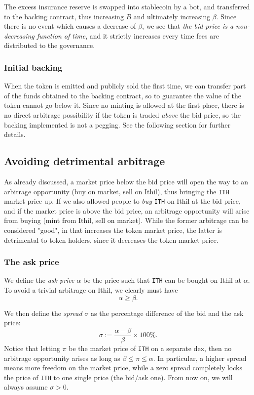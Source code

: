 \documentclass[a4paper,10 pt]{article}
\theoremstyle{definition}
\begin{document}
The excess insurance reserve is swapped into stablecoin by a bot, and transferred to the backing contract, thus increasing $B$ and ultimately increasing $\beta$. Since there is no event which causes a decrease of $\beta$, we see that {\it the bid price is a non-decreasing function of time}, and it strictly increases every time fees are distributed to the governance.

\subsubsection{Initial backing}

When the token is emitted and publicly sold the first time, we can transfer part of the funds obtained to the backing contract, so to guarantee the value of the token cannot go below it. Since no minting is allowed at the first place, there is no direct arbitrage possibility if the token is traded {\it above} the bid price, so the backing implemented is not a pegging. See the following section for further details.

\subsection{Avoiding detrimental arbitrage}

As already discussed, a market price below the bid price will open the way to an arbitrage opportunity (buy on market, sell on Ithil), thus bringing the \verb|ITH| market price up. If we also allowed people to {\it buy} \verb|ITH| on Ithil at the bid price, and if the market price is above the bid price, an arbitrage opportunity will arise from buying (mint from Ithil, sell on market). While the former arbitrage can be considered "good", in that increases the token market price, the latter is detrimental to token holders, since it decreases the token market price.

\subsubsection{The ask price}
We define the {\it ask price} $\alpha$ be the price such that \verb|ITH| can be bought on Ithil at $\alpha$. To avoid a trivial arbitrage on Ithil, we clearly must have $$\alpha \ge \beta.$$

We then define the {\it spread} $\sigma$ as the percentage difference of the bid and the ask price: $$\sigma := \frac{\alpha-\beta}{\beta} \times 100\%.$$
Notice that letting $\pi$ be the market price of \verb|ITH| on a separate dex, then no arbitrage opportunity arises as long as $\beta \le \pi \le \alpha$. In particular, a higher spread means more freedom on the market price, while a zero spread completely locks the price of \verb|ITH| to one single price (the bid/ask one).  From now on, we will always assume $\sigma > 0$.
\end{document}
